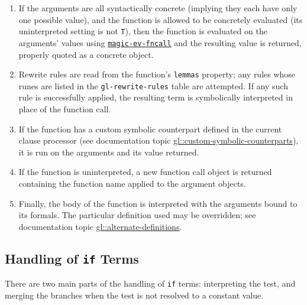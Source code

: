 \documentclass[submission,copyright,creativecommons]{eptcs}
\begin{document}
\begin{enumerate}
\item If the arguments are all syntactically concrete (implying they
  each have only one possible value), and the function is allowed to
  be concretely evaluated (its uninterpreted setting is not
  \texttt{T}), then the
  function is evaluated on the arguments' values using \href{http://www.cs.utexas.edu/users/moore/acl2/manuals/current/manual/?topic=ACL2____MAGIC-EV-FNCALL}{\underline{\texttt{magic-ev-fncall}}} and the resulting value is returned, properly quoted as a concrete object.
\item Rewrite rules are read from the function's \texttt{lemmas}
  property; any rules whose runes are listed in the
  \texttt{gl-rewrite-rules} table are attempted.  If any such rule is
  successfully applied, the resulting term is symbolically interpreted
  in place of the function call.
\item If the function has a custom symbolic counterpart defined in the
  current clause processor \cite{gl-diss} (see documentation topic
  \href{http://www.cs.utexas.edu/users/moore/acl2/manuals/current/manual/?topic=GL____CUSTOM-SYMBOLIC-COUNTERPARTS}{\underline{gl::custom-symbolic-counterparts}}),
  it is run on the arguments and its value returned.
\item If the function is uninterpreted, a new function call object is
  returned containing the function name applied to the argument
  objects.
\item Finally, the body of the function is interpreted with the
  arguments bound to its formals.  The particular definition used may
  be overridden; see documentation topic
  \href{http://www.cs.utexas.edu/users/moore/acl2/manuals/current/manual/?topic=GL____ALTERNATE-DEFINITIONS}{\underline{gl::alternate-definitions}}.
\end{enumerate}

\subsection{Handling of \texttt{if} Terms}

There are two main parts of the handling of \texttt{if} terms:
interpreting the test, and merging the branches when the test is not
resolved to a constant value.
\end{document}
